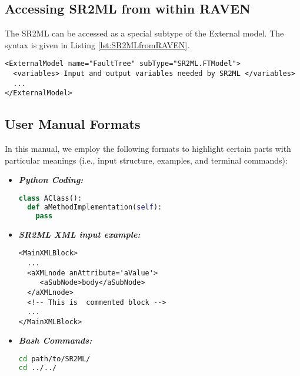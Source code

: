 \subsection{Accessing SR2ML from within RAVEN}
The SR2ML can be accessed as a special subtype of the External model.
The syntax is given in Listing \ref{lst:SR2MLfromRAVEN}.

\begin{lstlisting}[style=XML,morekeywords={anAttribute},caption=Call SR2ML.FTModel from RAVEN input., label=lst:SR2MLfromRAVEN]
<ExternalModel name="FaultTree" subType="SR2ML.FTModel">
  <variables> Input and output variables needed by SR2ML </variables>
  ...
</ExternalModel>
\end{lstlisting}

\subsection{User Manual Formats}
In this manual, we employ the following formats to highlight certain parts with
particular meanings (i.e., input structure, examples, and terminal commands):

\begin{itemize}
\item \textbf{\textit{Python Coding:}}
\begin{lstlisting}[language=python]
class AClass():
  def aMethodImplementation(self):
    pass
\end{lstlisting}
\item \textbf{\textit{SR2ML XML input example:}}
\begin{lstlisting}[style=XML,morekeywords={anAttribute}]
<MainXMLBlock>
  ...
  <aXMLnode anAttribute='aValue'>
     <aSubNode>body</aSubNode>
  </aXMLnode>
  <!-- This is  commented block -->
  ...
</MainXMLBlock>
\end{lstlisting}
\item \textbf{\textit{Bash Commands:}}
\begin{lstlisting}[language=bash]
cd path/to/SR2ML/
cd ../../
\end{lstlisting}
\end{itemize}

